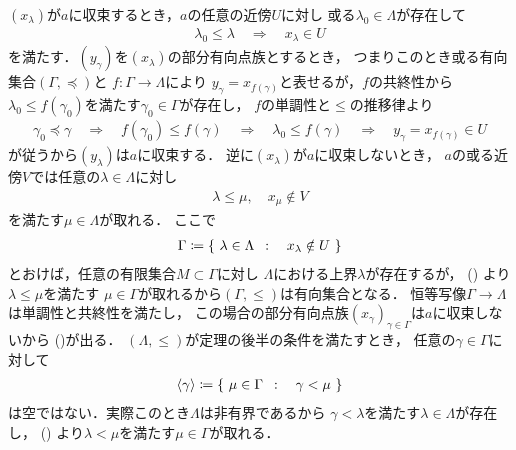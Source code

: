 	\begin{prf}
				$(x_\lambda)$が$a$に収束するとき，$a$の任意の近傍$U$に対し
				或る$\lambda_0 \in \Lambda$が存在して
				\begin{align}
					\lambda_0 \leq \lambda
					\quad \Longrightarrow \quad
					x_\lambda \in U
				\end{align}
				を満たす．$(y_\gamma)$を$(x_\lambda)$の部分有向点族とするとき，
				つまりこのとき或る有向集合$(\Gamma,\preceq)$と
				$f:\Gamma \longrightarrow \Lambda$により
				$y_\gamma = x_{f(\gamma)}$と表せるが，$f$の共終性から
				$\lambda_0 \leq f(\gamma_0)$を満たす$\gamma_0 \in \Gamma$が存在し，
				$f$の単調性と$\leq$の推移律より
				\begin{align}
					\gamma_0 \preceq \gamma
					\quad \Longrightarrow \quad
					f(\gamma_0) \leq f(\gamma)
					\quad \Longrightarrow \quad
					\lambda_0 \leq f(\gamma)
					\quad \Longrightarrow \quad
					y_\gamma = x_{f(\gamma)} \in U
				\end{align}
				が従うから$(y_\lambda)$は$a$に収束する．
				逆に$(x_\lambda)$が$a$に収束しないとき，
				$a$の或る近傍$V$では任意の$\lambda \in \Lambda$に対し
				\begin{align}
					\lambda \leq \mu,
					\quad x_\mu \notin V
					\label{eq:thm_a_net_converges_iff_every_subnet_converges_1}
				\end{align}
				を満たす$\mu \in \Lambda$が取れる．
				ここで
				\begin{align}
					\Gamma \coloneqq \left\{\ \lambda \in \Lambda\ \, : \quad x_\lambda \notin U\ \right\}
				\end{align}
				とおけば，任意の有限集合$M \subset \Gamma$に対し
				$\Lambda$における上界$\lambda$が存在するが，
				()
				より$\lambda \leq \mu$を満たす
				$\mu \in \Gamma$が取れるから$(\Gamma,\leq)$は有向集合となる．
				恒等写像$\Gamma \longrightarrow \Lambda$は単調性と共終性を満たし，
				この場合の部分有向点族$(x_\gamma)_{\gamma \in \Gamma}$は$a$に収束しないから
				()が出る．
				$(\Lambda,\leq)$が定理の後半の条件を満たすとき，
				任意の$\gamma \in \Gamma$に対して
				\begin{align}
					\inprod<\gamma> \coloneqq
					\Set{\mu \in \Gamma}{\gamma < \mu}
				\end{align}
				は空ではない．実際このとき$\Lambda$は非有界であるから
				$\gamma < \lambda$を満たす$\lambda \in \Lambda$が存在し，
				()
				より$\lambda < \mu$を満たす$\mu \in \Gamma$が取れる．

\end{prf}

